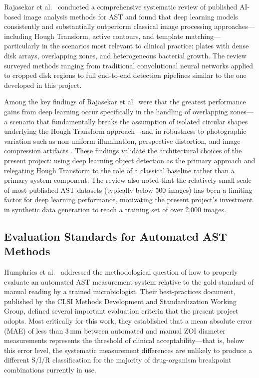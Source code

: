 Rajasekar et al.\ \cite{rajasekar2023} conducted a comprehensive
systematic review of published AI-based image analysis methods for AST and found that deep
learning models consistently and substantially outperform classical image processing approaches---
including Hough Transform, active contours, and template matching---particularly in the
scenarios most relevant to clinical practice: plates with dense disk arrays, overlapping zones,
and heterogeneous bacterial growth. The review surveyed methods ranging
from traditional convolutional neural networks applied to cropped disk regions to full end-to-end
detection pipelines similar to the one developed in this project.

Among the key findings of Rajasekar et al.\ were that the greatest performance gains from deep
learning occur specifically in the handling of overlapping zones---a scenario that fundamentally
breaks the assumption of isolated circular shapes underlying the Hough Transform approach---and
in robustness to photographic variation such as non-uniform illumination, perspective distortion,
and image compression artifacts \cite{rajasekar2023}. These findings validate the architectural
choices of the present project: using deep learning object detection as the primary approach
and relegating Hough Transform to the role of a classical baseline rather than a primary system
component. The review also noted that the relatively small scale of most published AST datasets
(typically below 500 images) has been a limiting factor for deep learning performance, motivating
the present project's investment in synthetic data generation to reach a training set of over
2,000 images.

\subsection{Evaluation Standards for Automated AST Methods}

Humphries et al.\ \cite{humphries2018} addressed the methodological question of how to properly
evaluate an automated AST measurement system relative to the gold standard of manual reading by
a trained microbiologist. Their best-practices document, published by the CLSI Methods
Development and Standardization Working Group, defined several important evaluation criteria
that the present project adopts. Most critically for this work, they established that a mean
absolute error (MAE) of less than 3\,mm between automated and manual ZOI diameter measurements
represents the threshold of clinical acceptability---that is, below this error level, the
systematic measurement differences are unlikely to produce a different S/I/R classification
for the majority of drug-organism breakpoint combinations currently in use.

